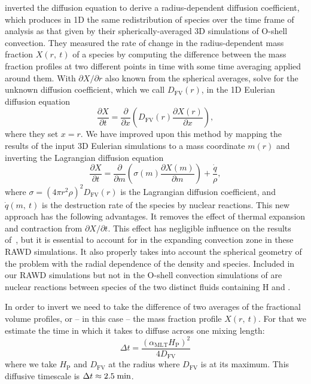 \documentclass[fleqn,usenatbib]{mnras}
\begin{document}
\citet{Jones:2017kc} inverted the diffusion equation to derive a
radius-dependent diffusion coefficient, which produces in 1D the same
redistribution of species over the time frame of analysis as that given by their
spherically-averaged 3D simulations of O-shell convection. They measured the
rate of change in the radius-dependent mass fraction $X(r,\ t)$ of a species by
computing the difference between the mass fraction profiles at two different
points in time with some time averaging applied around them. With $\partial X /
\partial r$ also known from the spherical averages, \citet{Jones:2017kc} solve
for the unknown diffusion coefficient, which we call $D_{\mathrm{FV}}(r)$, in
the 1D Eulerian diffusion equation
%
\begin{equation*}
\frac{\partial X}{\partial t} = \frac{\partial}{\partial x}\left( D_{\mathrm{FV}}(r)
\frac{\partial X(r)}{\partial x} \right),
\end{equation*}
%
where they set $x = r$. We have improved upon this method by mapping
the results of the input 3D Eulerian simulations to a mass coordinate
$m(r)$ and inverting the Lagrangian diffusion equation
%
\begin{equation}
\frac{\partial X}{\partial t} = \frac{\partial}{\partial m}\left( \sigma(m)
\frac{\partial X(m)}{\partial m} \right) + \frac{\dot{q}}{\rho},
\label{eq:diff-inv-burn}
\end{equation}
%
where $\sigma = (4\pi r^2 \rho)^2 D_\mathrm{FV}(r)$ is the Lagrangian diffusion
coefficient, and $\dot{q}(m,\ t)$ is the destruction rate of the species by
nuclear reactions. This new approach has the following advantages. It removes
the effect of thermal expansion and contraction from $\partial X / \partial t$.
This effect has negligible influence on the results of~\citet{Jones:2017kc}, but
it is essential to account for in the expanding convection zone in these RAWD
simulations. It also properly takes into account the spherical geometry of the
problem with the radial dependence of the density and species. Included in our
RAWD simulations but not in the O-shell convection simulations of
\citet{Jones:2017kc} are nuclear reactions between species of the two distinct
fluids containing H and .

In order to invert  we need to take the difference of two
averages of the fractional volume profiles, or -- in this case -- the mass
fraction profile $X(r,\ t)$. For that we estimate the time in which it takes to
diffuse across one mixing length:
%
\begin{equation*}
\Delta t = \frac{(\alpha_\mathrm{MLT} H_\mathrm{P})^2}{4D_{\mathrm{FV}}}
\end{equation*}
%
where we take $H_\mathrm{P}$ and $D_{\mathrm{FV}}$ at the radius where
$D_{\mathrm{FV}}$ is at its maximum. This diffusive timescale is $\Delta t
\approx 2.5\;\mathrm{\mathrm{min}}$.
\end{document}
